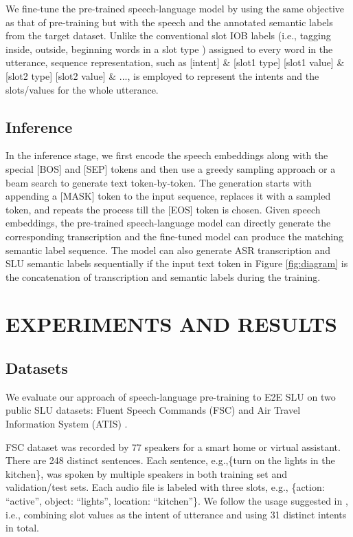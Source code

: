 \documentclass{article}
\begin{document}
We fine-tune the pre-trained speech-language model by using the same objective as that of pre-training but with the speech and the annotated semantic labels from the target dataset. Unlike the conventional slot IOB labels (i.e., tagging inside, outside, beginning words in a slot type ) assigned to every word in the utterance, sequence representation, such as [intent] \& [slot1 type] [slot1 value] \& [slot2 type] [slot2 value] \& ..., is employed to represent the intents and the slots/values for the whole utterance.  

\subsection{Inference}

In the inference stage, we first encode the speech embeddings along with the special [BOS] and [SEP] tokens and then use a greedy sampling approach or a beam search to generate text token-by-token. The generation starts with appending a [MASK] token to the input sequence, replaces it with a sampled token, and repeats the process till the [EOS] token is chosen. Given speech embeddings, the pre-trained speech-language model can directly generate the corresponding transcription and the fine-tuned model can produce the matching semantic label sequence. The model can also generate ASR transcription and SLU semantic labels sequentially if the input text token in Figure \ref{fig:diagram} is the concatenation of transcription and semantic labels during the training. 

\section{EXPERIMENTS AND RESULTS}
\label{sec:experiments}


\subsection{Datasets}
\label{ssec:Datasets}
We evaluate our approach of speech-language pre-training to E2E SLU on two public SLU datasets: Fluent Speech Commands (FSC) \cite{lugosch2019speech} and Air Travel Information System (ATIS) \cite{10008827816}.

FSC dataset was recorded by 77 speakers for a smart home or virtual assistant. There are 248 distinct sentences.  Each sentence, e.g.,\{turn on the lights in the kitchen\}, was spoken by multiple speakers in both training set and validation/test sets. Each audio file is labeled with three slots, e.g., \{action: “active”, object: “lights”, location: “kitchen”\}. We follow the usage suggested in \cite{lugosch2019speech}, i.e., combining slot values as the intent of utterance and using 31 distinct intents in total.
\end{document}
